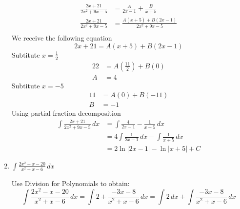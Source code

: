 \documentclass[12pt]{article}
\begin{document}
\begin{enumerate}
\begin{equation*}
  \begin{aligned}
  \frac{2x+21}{2x^{2}+9x-5}&=\frac{A}{2x-1}+\frac{B}{x+5}\\
  \frac{2x+21}{2x^{2}+9x-5}&=\frac{A(x+5)+B(2x-1)}{2x^{2}+9x-5}\\
  \end{aligned}
\end{equation*}
We receive the following equation
$$2x+21=A(x+5)+B(2x-1)$$
Subtitute $x = \displaystyle\frac{1}{2}$
\begin{equation*}
  \begin{aligned}
  22&=A\left(\frac{11}{2}\right)+B(0)\\
  A&=4
  \end{aligned}
\end{equation*}
Subtitute $x = -5$
\begin{equation*}
  \begin{aligned}
  11&=A(0)+B(-11)\\
  B&=-1
  \end{aligned}
\end{equation*}
Using partial fraction decomposition
\begin{equation*}
  \begin{aligned}
  \int\frac{2x+21}{2x^{2}+9x-5}\,dx&=\int\frac{4}{2x-1}-\frac{1}{x+5}\,dx\\
  &=4\int\frac{1}{2x-1}\,dx-\int\frac{1}{x+5}\,dx\\
  &=2\ln|2x-1|-\ln|x+5|+C
  \end{aligned}
\end{equation*}

\item $\displaystyle\int\frac{2x^{2}-x-20}{x^{2}+x-6}\,dx$

Use Division for Polynomials to obtain:
$$\int\frac{2x^{2}-x-20}{x^{2}+x-6}\,dx=\int{2}+\frac{-3x-8}{x^{2}+x-6}\,dx=\int{2}\,dx+\int\frac{-3x-8}{x^2+x-6}\,dx$$


\end{enumerate}
\end{document}
